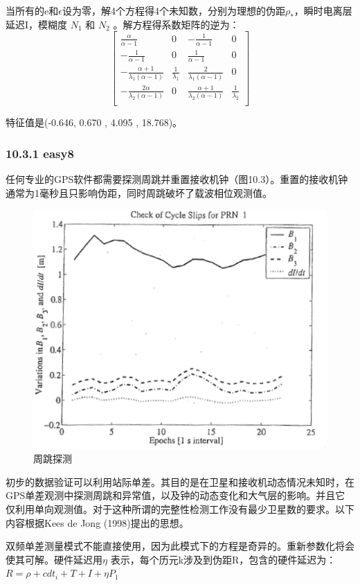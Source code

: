当所有的e和$\epsilon$设为零，解4个方程得4个未知数，分别为理想的伪距$\rho_{*}$，瞬时电离层延迟I，模糊度 $N_{1}$ 和 $N_{2}$ 。解方程得系数矩阵的逆为：
\begin{equation}
	\begin{bmatrix}
		\frac{\alpha}{\alpha-1}&0&-\frac{1}{\alpha-1}&0\\
		-\frac{1}{\alpha-1}&0&\frac{1}{\alpha-1}&0\\
		-\frac{\alpha+1}{\lambda_{1}(\alpha-1)}&\frac{1}{\lambda_{1}}&\frac{2}{\lambda_{1}(\alpha-1)}&0\\
		-\frac{2\alpha}{\lambda_{2}(\alpha-1)}&0&\frac{\alpha+1}{\lambda_{2}(\alpha-1)}&\frac{1}{\lambda_{2}}\\
	\end{bmatrix}
\end{equation}

特征值是(-0.646, 0.670 , 4.095 , 18.768)。

\subsubsection{10.3.1 easy8}

任何专业的GPS软件都需要探测周跳并重置接收机钟（图10.3）。重置的接收机钟通常为1毫秒且只影响伪距，同时周跳破坏了载波相位观测值。

\begin{figure}
	\centering
	\includegraphics[width=0.4\linewidth]{TeX_files/Part03/chapter10/image/9-3}
	\caption{周跳探测}
	\label{fig:9-3}
\end{figure}

初步的数据验证可以利用站际单差。其目的是在卫星和接收机动态情况未知时，在GPS单差观测中探测周跳和异常值，以及钟的动态变化和大气层的影响。并且它仅利用单向观测值。对于这种所谓的完整性检测工作没有最少卫星数的要求。以下内容根据Kees de Jong (1998)提出的思想。

双频单差测量模式不能直接使用，因为此模式下的方程是奇异的。重新参数化将会使其可解。硬件延迟用$\eta$ 表示，每个历元k涉及到伪距R，包含的硬件延迟为：$R=\rho+cdt_{i}+T+I+\eta P_{1}$

